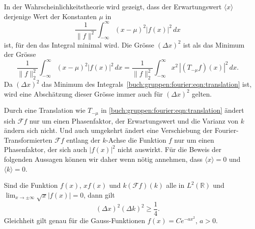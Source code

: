 In der Wahrscheinlichkeitstheorie wird gezeigt, dass der Erwartungswert
$\langle x\rangle$ derjenige Wert der Konstanten $\mu$ in
\begin{equation*}
\frac{1}{\|f\|^2}
\int_{-\infty}^\infty
(x-\mu)^2 
|f(x)|^2
\,dx
\end{equation*}
ist, für den das Integral minimal wird.
Die Grösse $(\Delta x)^2$ ist als das Minimum der Grösse
\begin{equation}
\frac{1}{\|f\|_2^2}
\int_{-\infty}^\infty
(x-\mu)^2 
|f(x)|^2
\,dx
=
\frac{1}{\|f\|_2^2}
\int_{-\infty}^\infty
x^2\, |(T_{-\mu}f)(x)|^2
\,dx.
\label{buch:gruppen:fourier:eqn:translation}
\end{equation}
Da $(\Delta x)^2$ das Minimum des
Integrals~\eqref{buch:gruppen:fourier:eqn:translation} ist, wird
eine Abschätzung dieser Grösse immer auch für $(\Delta x)^2$ gelten.

Durch eine Translation wie $T_{-\mu}$ in
\eqref{buch:gruppen:fourier:eqn:translation}
ändert sich $\mathscr{F}f$ nur um einen Phasenfaktor,
der Erwartungswert und die Varianz von $k$ ändern sich nicht.
Und auch umgekehrt ändert eine Verschiebung der Fourier-Transformierten
$\mathscr{F}f$ entlang der $k$-Achse die Funktion $f$ nur um einen
Phasenfaktor, der sich auch $|f(x)|^2$ nicht auswirkt. 
Für die Beweis der folgenden Aussagen können wir daher wenn nötig annehmen,
dass $\langle x\rangle=0$ und $\langle k\rangle = 0$.

\begin{satz}
\label{buch:gruppen:fourier:satz:heisenberg-pauli-weyl}
Sind die Funktion $f(x)$, $xf(x)$ und $k(\mathscr{F}f)(k)$ alle in
$L^2(\mathbb{R})$ und $\lim_{x\to\pm\infty} \!\sqrt{x}|f(x)|=0$, dann
gilt
\begin{equation}
(\Delta x)^2
(\Delta k)^2
\ge 
\frac14.
\label{buch:gruppen:fourier:eqn:heisenberg-pauli-weyl}
\end{equation}
Gleichheit gilt genau für die Gauss-Funktionen $f(x)=Ce^{-ax^2}$, $a>0$.
\end{satz}

